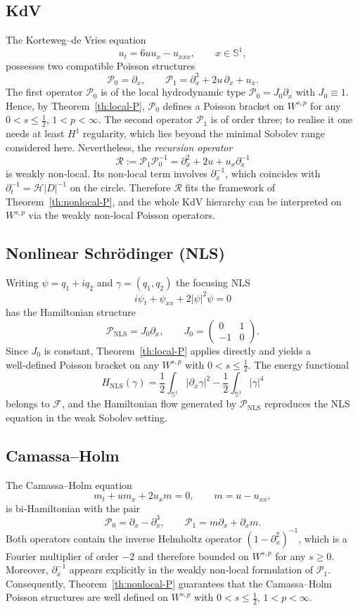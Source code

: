 \documentclass{amsart}
\newcounter{ex}
\newcounter{re}
\begin{document}
\subsection{KdV}
The Korteweg–de Vries equation
\[
u_{t}=6uu_{x}-u_{xxx},\qquad x\in\mathbb S^{1},
\]
possesses two compatible Poisson structures
\[
\mathcal P_{0}=\partial_{x},\qquad
\mathcal P_{1}=\partial_{x}^{3}+2u\,\partial_{x}+u_{x}.
\]
The first operator \(\mathcal P_{0}\) is of the local hydrodynamic type
\(\mathcal P_{0}=J_{0}\partial_{x}\) with \(J_{0}\equiv1\).  Hence, by
Theorem~\ref{th:local-P}, \(\mathcal P_{0}\) defines a Poisson bracket on
\(W^{s,p}\) for any \(0<s\le\tfrac12\), \(1<p<\infty\).  The second operator
\(\mathcal P_{1}\) is of order three; to realise it one needs at least
\(H^{1}\) regularity, which lies beyond the minimal Sobolev range considered
here.  Nevertheless, the \emph{recursion operator}
\[
\mathcal R:=\mathcal P_{1}\mathcal P_{0}^{-1}
   =\partial_{x}^{2}+2u+u_{x}\partial_{x}^{-1}
\]
is weakly non‑local.  Its non‑local term involves \(\partial_{x}^{-1}\), which
coincides with \(\partial_{t}^{-1}=\mathcal H|D|^{-1}\) on the circle.
Therefore \(\mathcal R\) fits the framework of Theorem~\ref{th:nonlocal-P},
and the whole KdV hierarchy can be interpreted on \(W^{s,p}\) via the
weakly non‑local Poisson operators.

\subsection{Nonlinear Schrödinger (NLS)}
Writing \(\psi=q_{1}+iq_{2}\) and \(\gamma=(q_{1},q_{2})\) the focusing NLS
\[
i\psi_{t}+\psi_{xx}+2|\psi|^{2}\psi=0
\]
has the Hamiltonian structure
\[
\mathcal P_{\mathrm{NLS}}=J_{0}\partial_{x},
\qquad
J_{0}=
\begin{pmatrix}0&1\\-1&0\end{pmatrix}.
\]
Since \(J_{0}\) is constant, Theorem~\ref{th:local-P} applies directly and yields a
well‑defined Poisson bracket on any \(W^{s,p}\) with \(0<s\le\tfrac12\).  The
energy functional
\[
H_{\mathrm{NLS}}(\gamma)
   =\frac12\int_{\mathbb S^{1}}|\partial_{x}\gamma|^{2}
      -\frac12\int_{\mathbb S^{1}}|\gamma|^{4}
\]
belongs to \(\mathcal F\), and the Hamiltonian flow generated by \(\mathcal
P_{\mathrm{NLS}}\) reproduces the NLS equation in the weak Sobolev setting.

\subsection{Camassa–Holm}
The Camassa–Holm equation
\[
m_{t}+um_{x}+2u_{x}m=0,\qquad m=u-u_{xx},
\]
is bi‑Hamiltonian with the pair
\[
\mathcal P_{0}=\partial_{x}-\partial_{x}^{3},
\qquad
\mathcal P_{1}=m\partial_{x}+\partial_{x}m .
\]
Both operators contain the inverse Helmholtz operator \((1-\partial_{x}^{2})^{-1}\),
which is a Fourier multiplier of order \(-2\) and therefore bounded on
\(W^{s,p}\) for any \(s\ge0\).  Moreover, \(\partial_{x}^{-1}\) appears explicitly
in the weakly non‑local formulation of \(\mathcal P_{1}\).  Consequently,
Theorem~\ref{th:nonlocal-P} guarantees that the Camassa–Holm Poisson
structures are well defined on \(W^{s,p}\) with \(0<s\le\tfrac12\), \(1<p<\infty\).
\end{document}
